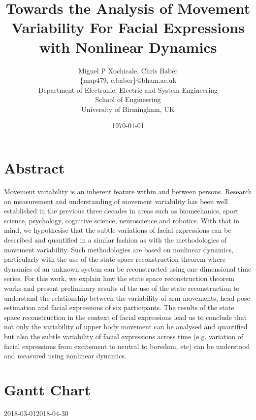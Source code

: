 \documentclass[12pt]{article}
\author{Miguel P Xochicale, Chris Baber \\
\{map479, c.baber\}@bham.ac.uk \\
Department of Electronic, Electric and System Engineering\\
School of Engineering\\
University of Birmingham, UK}
\title{Towards the Analysis of Movement Variability For Facial Expressions with
Nonlinear Dynamics}
\date{\today}
\begin{document}
\maketitle

\section*{Abstract}
Movement variability is an inherent feature within and between persons.
Research on measurement and understanding of movement variability has been well
established in the previous three decades in areas such as biomechanics,
sport science, psychology, cognitive science, neuroscience and robotics.
With that in mind, we hypothesise that the subtle variations of facial expressions
can be described and quantified in a similar fashion as with the methodologies
of movement variability.
Such methodologies are based on nonlinear dynamics, particularly with the use of
the state space reconstruction theorem where dynamics of an unknown system
can be reconstructed using one dimensional time series.
For this work, we explain how the state space reconstruction theorem works and
present preliminary results of the use of the state reconstruction
to understand the relationship between the variability of arm movements, head
pose estimation and facial expressions of six participants.
The results of the state space reconstruction in the context of facial expressions
lead us to conclude that not only the variability of upper body movement can be
analysed and quantified but also the subtle variability of facial expressions
across time (e.g. variation of facial expressions from excitement to neutral to boredom, etc)
can be understood and measured using nonlinear dynamics.


\section*{Gantt Chart}

\begin{ganttchart}[
	hgrid,
	vgrid,
	x unit=2mm,
	time slot format=isodate-yearmonth
	]{2018-03-01}{2018-04-30}
 \\
 \\
 
\end{ganttchart}
\end{document}
